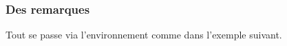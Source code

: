 \documentclass[12pt, a4paper]{article}
\begin{document}

\subsubsection{Des remarques}

Tout se passe via l'environnement  comme dans l'exemple suivant.

\end{document}
